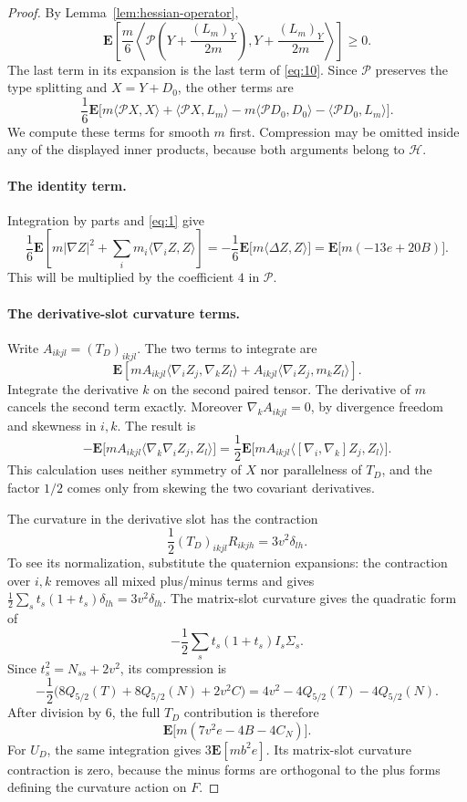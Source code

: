 \begin{proof}
By Lemma~\ref{lem:hessian-operator},
\[
 \mathbf E\left[
 \frac{m}{6}\left\langle
 \mathcal P\left(Y+\frac{(L_m)_Y}{2m}\right),
              Y+\frac{(L_m)_Y}{2m}\right\rangle\right]\ge0.
\]
The last term in its expansion is the last term of \eqref{eq:10}.
Since \(\mathcal P\) preserves the type splitting and
\(X=Y+D_0\), the other terms are
\[
 \frac16\mathbf E\bigl[
 m\langle\mathcal PX,X\rangle+\langle\mathcal PX,L_m\rangle
 -m\langle\mathcal PD_0,D_0\rangle-\langle\mathcal PD_0,L_m\rangle
 \bigr].
\]
We compute these terms for smooth \(m\) first.  Compression may be omitted
inside any of the displayed inner products, because both arguments
belong to \(\mathcal H\).

\paragraph{The identity term.}
Integration by parts and \eqref{eq:1} give
\[
 \frac16\mathbf E\left[m|\nabla Z|^2
           +\sum_i m_i\langle\nabla_iZ,Z\rangle\right]
 =-\frac16\mathbf E\bigl[m\langle\Delta Z,Z\rangle\bigr]
 =\mathbf E\bigl[m(-13e+20B)\bigr].
\]
This will be multiplied by the coefficient \(4\) in \(\mathcal P\).

\paragraph{The derivative-slot curvature terms.}
Write \(A_{ikjl}=(T_D)_{ikjl}\).  The two terms to integrate are
\[
 \mathbf E\left[
 mA_{ikjl}\langle\nabla_iZ_j,\nabla_kZ_l\rangle
 +A_{ikjl}\langle\nabla_iZ_j,m_kZ_l\rangle\right].
\]
Integrate the derivative \(k\) on the second paired tensor.
The derivative of \(m\) cancels the second term exactly.
Moreover \(\nabla_kA_{ikjl}=0\), by divergence freedom and skewness in
\(i,k\).  The result is
\[
 -\mathbf E\bigl[mA_{ikjl}\langle\nabla_k\nabla_iZ_j,Z_l\rangle\bigr]
 =\frac12\mathbf E\bigl[
 mA_{ikjl}\langle[\nabla_i,\nabla_k]Z_j,Z_l\rangle\bigr].
\]
This calculation uses neither symmetry of \(X\) nor parallelness of
\(T_D\), and the factor \(1/2\) comes only from skewing the two
covariant derivatives.

The curvature in the derivative slot has the contraction
\[
 \frac12(T_D)_{ikjl}R_{ikjh}=3v^2\delta_{lh}.
\]
To see its normalization, substitute the quaternion expansions: the
contraction over \(i,k\) removes all mixed plus/minus terms and gives
\(\frac12\sum_s t_s(1+t_s)\delta_{lh}=3v^2\delta_{lh}\).
The matrix-slot curvature gives the quadratic form of
\[
 -\frac12\sum_s t_s(1+t_s)I_s\Sigma_s.
\]
Since \(t_s^2=N_{ss}+2v^2\), its compression is
\[
 -\frac12\bigl(8Q_{5/2}(T)+8Q_{5/2}(N)+2v^2C\bigr)
 =4v^2-4Q_{5/2}(T)-4Q_{5/2}(N).
\]
After division by \(6\), the full \(T_D\) contribution is therefore
\[
 \mathbf E\bigl[m(7v^2e-4B-4C_N)\bigr].
\]
For \(U_D\), the same integration gives \(3\mathbf E[mb^2e]\).
Its matrix-slot curvature contraction is zero, because the minus forms
are orthogonal to the plus forms defining the curvature action on
\(F\).


\end{proof}
